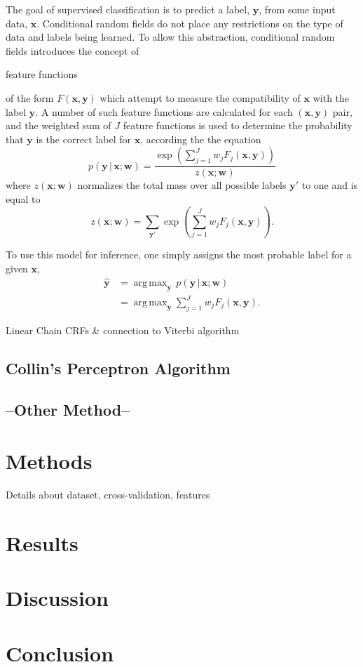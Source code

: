 \documentclass[10pt,twocolumn,letterpaper]{article}
\newcommand{\x}{\mathbf{x}}
\newcommand{\y}{\mathbf{y}}
\newcommand{\w}{\mathbf{w}}
\DeclareMathOperator*{\argmax}{arg\,max}
\begin{document}
The goal of supervised classification is to predict a label, $\y$, from some input data, $\x$. Conditional random fields do not place any restrictions on the type of data and labels being learned. To allow this abstraction, conditional random fields introduces the concept of \begin{em}feature functions\end{em} of the form $F(\x,\y)$ which attempt to measure the compatibility of $\x$ with the label $\y$. A number of such feature functions are calculated for each $(\x,\y)$ pair, and the weighted sum of $J$ feature functions is used to determine the probability that $\y$ is the correct label for $\x$, according the the equation
\[ p(\y\,|\,\x;\w) = \frac{\exp \left( \sum_{j=1}^J w_j F_j (\x,\y) \right)}{z(\x;\w)} \]
where $z(\x;\w)$ normalizes the total mass over all possible labels $\y'$ to one and is equal to
\[ z(\x;\w) = \sum_{\y'} \exp \left( \sum_{j=1}^J w_j F_j (\x,\y) \right). \]

To use this model for inference, one simply assigns the most probable label for a given $\x$,
\begin{align}
\hat{\y} & =\argmax_{\y} \, p(\y\,|\,\x;\w) \\
&= \argmax_{\y} \sum_{j=1}^J w_j F_j(\x,\y).
\end{align}

Linear Chain CRFs & connection to Viterbi algorithm
\subsection{Collin's Perceptron Algorithm}
\subsection{--Other Method--}

\section{Methods}
Details about dataset, cross-validation, features



\section{Results}
\section{Discussion}
\section{Conclusion}



{\small


}
\end{document}

